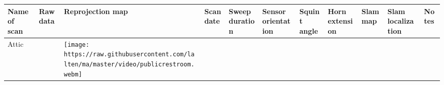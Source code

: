 \begin{longtable}[]{@{}lllllllllll@{}}
\toprule
\begin{minipage}[b]{0.04\columnwidth}\raggedright\strut
Name of scan\strut
\end{minipage} & \begin{minipage}[b]{0.04\columnwidth}\raggedright\strut
Raw data\strut
\end{minipage} & \begin{minipage}[b]{0.04\columnwidth}\raggedright\strut
Reprojection map\strut
\end{minipage} & \begin{minipage}[b]{0.04\columnwidth}\raggedright\strut
Scan date\strut
\end{minipage} & \begin{minipage}[b]{0.04\columnwidth}\raggedright\strut
Sweep duration\strut
\end{minipage} & \begin{minipage}[b]{0.04\columnwidth}\raggedright\strut
Sensor orientation\strut
\end{minipage} & \begin{minipage}[b]{0.04\columnwidth}\raggedright\strut
Squint angle\strut
\end{minipage} & \begin{minipage}[b]{0.04\columnwidth}\raggedright\strut
Horn extension\strut
\end{minipage} & \begin{minipage}[b]{0.04\columnwidth}\raggedright\strut
Slam map\strut
\end{minipage} & \begin{minipage}[b]{0.04\columnwidth}\raggedright\strut
Slam localization\strut
\end{minipage} & \begin{minipage}[b]{0.04\columnwidth}\raggedright\strut
Notes\strut
\end{minipage}\tabularnewline
\midrule
\endhead
\begin{minipage}[t]{0.04\columnwidth}\raggedright\strut
Attic\strut
\end{minipage} & \begin{minipage}[t]{0.04\columnwidth}\raggedright\strut
\strut
\end{minipage} & \begin{minipage}[t]{0.04\columnwidth}\raggedright\strut
\texttt{[image: https://raw.githubusercontent.com/lalten/ma/master/video/publicrestroom.webm]}\strut
\end{minipage} & \begin{minipage}[t]{0.04\columnwidth}\raggedright\strut

\end{minipage}
\end{longtable}
